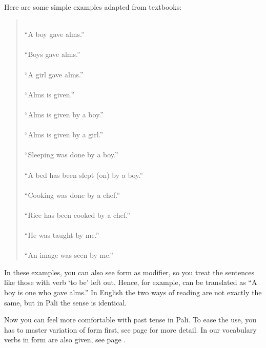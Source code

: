 Here are some simple examples adapted from textbooks:

\begin{quote}
\\
``A boy gave alms.''\\[1.5mm]
\\
``Boys gave alms.''\\[1.5mm]
\\
``A girl gave alms.''\\[1.5mm]
\\
``Alms is given.''\\[1.5mm]
\\
``Alms is given by a boy.''\\[1.5mm]
\\
``Alms is given by a girl.''\\[1.5mm]
\\
``Sleeping was done by a boy.''\\[1.5mm]
\\
``A bed has been slept (on) by a boy.''\\[1.5mm]
\\
``Cooking was done by a chef.''\\[1.5mm]
\\
``Rice has been cooked by a chef.''\\[1.5mm]
\\
``He was taught by me.''\\[1.5mm]
\\
``An image was seen by me.''\\[1.5mm]
\end{quote}

In these examples, you can also see  form as modifier, so you treat the sentences like those with verb `to be' left out. Hence, for example,  can be translated as ``A boy is one who gave alms.'' In English the two ways of reading are not exactly the same, but in P\=ali the sense is identical.

Now you can feel more comfortable with past tense in P\=ali. To ease the use, you has to master variation of  form first, see page \pageref{sec:irrprod} for more detail. In our vocabulary verbs in  form are also given, see page \pageref{vocab:verb}.

